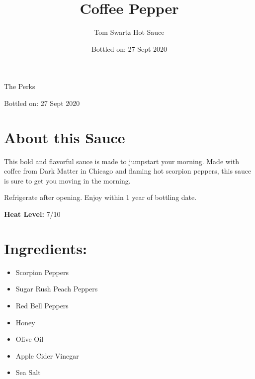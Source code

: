 \documentclass[12pt]{article}
\title{Coffee Pepper}
\author{Tom Swartz Hot Sauce}
\date{Bottled on: 27 Sept 2020}
\begin{document}
\begin{center}
{\Huge The Perks}
\par
{\Large Bottled on: 27 Sept 2020}
\vfill
\begin{minipage}{0.45\textwidth}
\Large
\section*{About this Sauce \color{black}\hrulefill\color{black}}
This bold and flavorful sauce is made to jumpstart your morning.
Made with coffee from Dark Matter in Chicago and flaming hot scorpion peppers,
this sauce is sure to get you moving in the morning.
\par
Refrigerate after opening.
Enjoy within 1 year of bottling date.
\begin{center}
        {\LARGE
        \textbf{Heat Level:} 7/10
        }
\end{center}
\end{minipage}
\hfill
\begin{minipage}{0.45\textwidth}
\vspace{-0.4cm}
\Large
\section*{\hspace{0.5cm}Ingredients: \color{black}\hrulefill\color{black}}
\begin{itemize}
        \item Scorpion Peppers
        \item Sugar Rush Peach Peppers
        \item Red Bell Peppers
        \item Honey
        \item Olive Oil
        \item Apple Cider Vinegar
        \item Sea Salt
\end{itemize}
\end{minipage}
\end{center}
\end{document}
